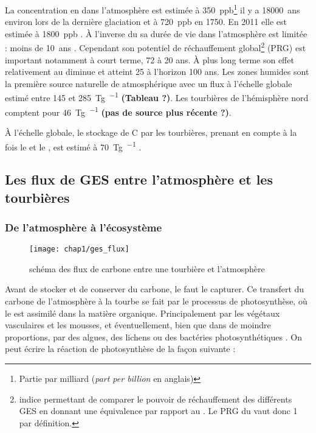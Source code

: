 La concentration en \chh dans l'atmosphère est estimée à \SI{350}{ppb}\footnote{Partie par milliard (\textit{part per billion} en anglais)} il y a \SI{18000}{ans} environ lors de la dernière glaciation et à \SI{720}{ppb} en 1750.
En 2011 elle est estimée à \SI{1800}{ppb} \citep{Ciais2014}.
À l'inverse du \coo sa durée de vie dans l'atmosphère est limitée : moins de \SI{10}{ans} \citep{lelieveld1998,prather2012}.
Cependant son potentiel de réchauffement global\footnote{indice permettant de comparer le pouvoir de réchauffement des différents GES en donnant une équivalence par rapport au \coo. Le PRG du \coo vaut donc 1 par définition.} (PRG) est important notamment à court terme, 72 à 20 ans.
À plus long terme son effet relativement au \coo diminue et atteint 25 à l'horizon 100 ans.
Les zones humides sont la première source naturelle de \chh atmosphérique avec un flux à l'échelle globale estimé entre \num{145} et \SI{285}{\tera\gram\per\year} \citep{lelieveld1998,wuebbles2002,Ciais2014} \textbf{(Tableau ?)}.
Les tourbières de l'hémisphère nord comptent pour \SI{46}{\tera\gram\per\year} \citep{gorham1991} \textbf{(pas de source plus récente ?)}.


À l'échelle globale, le stockage de C par les tourbières, prenant en compte à la fois le \coo et le \chh, est estimé à \SI{70}{\tera\gram\per\year} \citep{clymo1998}.

\subsection{Les flux de GES entre l'atmosphère et les tourbières}

\subsubsection{De l'atmosphère à l'écosystème}

\begin{figure}
\centering
\texttt{[image: chap1/ges\_flux]}
\caption{schéma des flux de carbone entre une tourbière et l'atmosphère}
\label{fig:ges_flux}
\end{figure}

Avant de stocker et de conserver du carbone, le faut le capturer.
Ce transfert du carbone de l'atmosphère à la tourbe se fait par le processus de photosynthèse, où le \coo est assimilé dans la matière organique.
Principalement par les végétaux vasculaires et les mousses, et éventuellement, bien que dans de moindre proportions, par des algues, des lichens ou des bactéries photosynthétiques \citep{girard2011}.
On peut écrire la réaction de photosynthèse de la façon suivante : 

